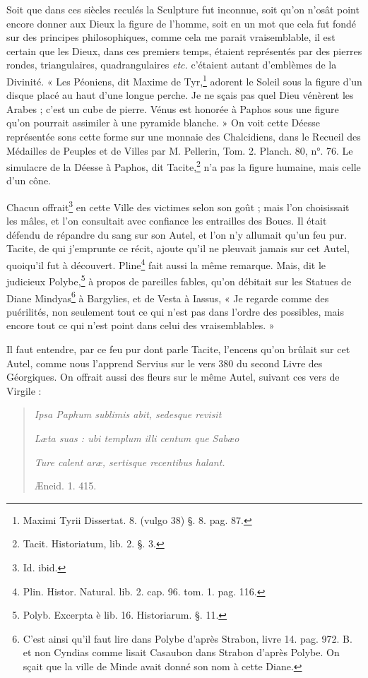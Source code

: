 \documentclass[a4paper, 18pt, oneside]{article}
\begin{document}
Soit que dans ces siècles reculés la Sculpture fut inconnue, soit qu'on n'osât point encore donner aux Dieux la figure de l'homme, soit en un mot que cela fut fondé sur des principes philosophiques, comme cela me parait vraisemblable, il est certain que les Dieux, dans ces premiers temps, étaient représentés par des pierres rondes, triangulaires, quadrangulaires \emph{etc.} c'étaient autant d'emblèmes de la Divinité. « Les Péoniens, dit Maxime de Tyr,\footnote{Maximi Tyrii Dissertat. 8. (vulgo 38) §. 8. pag. 87.} adorent le Soleil sous la figure d'un disque placé au haut d'une longue perche. Je ne sçais pas quel Dieu vénèrent les Arabes ; c'est un cube de pierre. Vénus est honorée à Paphos sous une figure qu'on pourrait assimiler à une pyramide blanche. » On voit cette Déesse représentée sons cette forme sur une monnaie des Chalcidiens, dans le Recueil des Médailles de Peuples et de Villes par M. Pellerin, Tom. 2. Planch. 80, n°. 76. Le simulacre de la Déesse à Paphos, dit Tacite,\footnote{Tacit. Historiatum, lib. 2. §. 3.} n'a pas la figure humaine, mais celle d'un cône.

Chacun offrait\footnote{Id. ibid.} en cette Ville des victimes selon son goût ; mais l'on choisissait les mâles, et l'on consultait avec confiance les entrailles des Boucs. Il était défendu de répandre du sang sur son Autel, et l'on n'y allumait qu'un feu pur. Tacite, de qui j'emprunte ce récit, ajoute qu'il ne pleuvait jamais sur cet Autel, quoiqu'il fut à découvert. Pline\footnote{Plin. Histor. Natural. lib. 2. cap. 96. tom. 1. pag. 116.} fait aussi la même remarque. Mais, dit le judicieux Polybe,\footnote{Polyb. Excerpta è lib. 16. Historiarum. §. 11.} à propos de pareilles fables, qu'on débitait sur les Statues de Diane Mindyas\footnote{C'est ainsi qu'il faut lire dans Polybe d'après Strabon, livre 14. pag. 972. B. et non Cyndias comme lisait Casaubon dans Strabon d'après Polybe. On sçait que la ville de Minde avait donné son nom à cette Diane.} à Bargylies, et de Vesta à Iassus, « Je regarde comme des puérilités, non seulement tout ce qui n'est pas dans l'ordre des possibles, mais encore tout ce qui n'est point dans celui des vraisemblables. »

Il faut entendre, par ce feu pur dont parle Tacite, l'encens qu'on brûlait sur cet Autel, comme nous l'apprend Servius sur le vers 380 du second Livre des Géorgiques. On offrait aussi des fleurs sur le même Autel, suivant ces vers de Virgile :
\begin{quotation}
\emph{Ipsa Paphum sublimis abit, sedesque revisit}

\emph{Læta suas : ubi templum illi centum que Sabæo}

\emph{Ture calent aræ, sertisque recentibus halant.}

\hspace*{35mm}Æneid. 1. 415.
\end{quotation}
\end{document}
